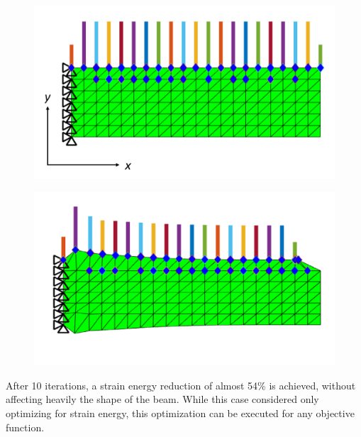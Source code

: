 \begin{figure}[ht]
\centering
\begin{minipage}{.5\textwidth}
  \centering
  \includegraphics[width=1.0\linewidth]{images/cantileverBeamBCs.png}
  \label{cantileverBeam:BCs2}
\end{minipage}%
\begin{minipage}{.5\textwidth}
  \centering
  \includegraphics[width=1.0\linewidth]{images/cantileverBeamOptimized.png}
  \label{fig:optimizedGeometry}
\end{minipage}
\end{figure}
After 10 iterations, a strain energy reduction of almost 54\% is achieved, without affecting heavily the shape of the beam. While this case considered only optimizing for strain energy, this optimization can be executed for any objective function.\\[6pt]
